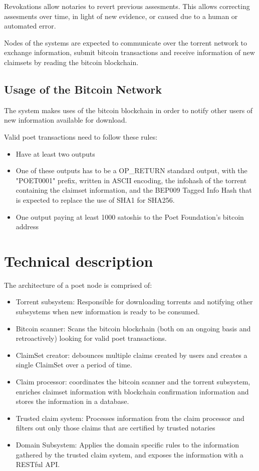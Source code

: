 \documentclass[12pt]{article}
\begin{document}
Revokations allow notaries to revert previous assesments. This allows correcting assesments over time, in light of new evidence, or caused due to a human or automated error.

Nodes of the systems are expected to communicate over the torrent network to exchange information, submit bitcoin transactions and receive information of new claimsets by reading the bitcoin blockchain.

\subsection{Usage of the Bitcoin Network}

The system makes uses of the bitcoin blockchain in order to notify other users of new information available for download.

Valid poet transactions need to follow these rules:
\begin{itemize}
    \item Have at least two outputs
    \item One of these outputs has to be a OP\_RETURN standard output, with
      the "POET0001" prefix, written in ASCII encoding,
      the infohash of the torrent containing the claimset information,
      and the BEP009 Tagged Info Hash that is expected to replace the use of SHA1 for SHA256.
    \item One output paying at least 1000 satoshis to the Poet Foundation's bitcoin address

\end{itemize}

\section{Technical description}

The architecture of a poet node is comprised of:

\begin{itemize}
    \item Torrent subsystem: Responsible for downloading torrents and notifying other subsystems when new information is ready to be consumed.
    \item Bitcoin scanner: Scans the bitcoin blockchain (both on an ongoing basis and retroactively) looking for valid poet transactions.
    \item ClaimSet creator: debounces multiple claims created by users and creates a single ClaimSet over a period of time.
    \item Claim processor: coordinates the bitcoin scanner and the torrent subsystem, enriches claimset information with blockchain confirmation information and stores the information in a database. 
    \item Trusted claim system: Processes information from the claim processor and filters out only those claims that are certified by trusted notaries
    \item Domain Subsystem: Applies the domain specific rules to the information gathered by the trusted claim system, and exposes the information with a RESTful API.
\end{itemize}
\end{document}
